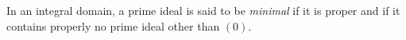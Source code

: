 In an integral domain, a prime ideal is said to be \textit{minimal} if it is proper and if it contains properly no prime ideal other than $(0)$.

